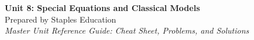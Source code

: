 




\begin{center}
    {\LARGE \bfseries Unit 8: Special Equations and Classical Models}\\[6pt]
    {\large Prepared by Staples Education}\\[4pt]
    {\itshape Master Unit Reference Guide: Cheat Sheet, Problems, and Solutions}
\end{center}

\vspace{0.4em}

\tableofcontents

\vspace{0.4em}

